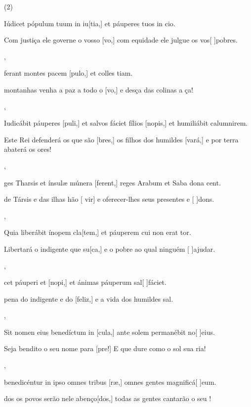 \SetVersePairs(2){
  {\item {}Iúdicet pópulum tuum in iu[tia,] et páuperes tuos in cio.~\Responsorium}%
    {\item {}Com justiça ele governe o vosso [vo,] com equidade ele julgue os vos[ ]{po}bres.~\Responsorium},
  {\item {}ferant montes pacem [pulo,] et colles \-ti\-am.~\Responsorium}%
    {\item {} montanhas venha a paz a todo o [vo,] e desça das colinas a ça!~\Responsorium},
  {\item {}Iudicábit páuperes [puli,] et salvos fáciet fílios [no\-pis,] et humiliábit calumnirem.~\Responsorium}%
    {\item {}Este Rei defenderá os que são [bres,] os filhos dos humildes [vará,] e por terra abaterá os ores!~\Responsorium},
  {\item {}ges Tharsis et ínsulæ múnera [ferent,] reges Arabum et Saba dona cent.~\Responsorium}%
    {\item {} de Társis e das ilhas hão [ vir] e oferecer-lhes seus presentes e [ ]{dons}.~\Responsorium},
  {\item {}Quia liberábit ínopem cla[tem,] et páuperem cui non erat tor.~\Responsorium}%
    {\item {}Libertará o indigente que su[ca,] e o pobre ao qual ninguém [ ]{a}judar.~\Responsorium},
  {\item {}cet páuperi et [nopi,] et ánimas páuperum sal[ ]{fá}\-ci\-et.~\Responsorium}%
    {\item {} pena do indigente e do [feliz,] e a vida dos humildes sal.~\Responsorium},
  {\item {}Sit nomen eius benedíctum in [cula,] ante solem permanébit no[ ]{e}ius.~\Responsorium}%
    {\item {}Seja bendito o seu nome para [pre!] E que dure como o sol sua ria!~\Responsorium},
  {\item {} benedicéntur in ipso omnes tribus [ræ,] omnes gentes magnificá[ ]{e}um.~\Responsorium}%
    {\item {}dos os povos serão nele abenço[dos,] todas as gentes cantarão o seu !~\Responsorium}
}